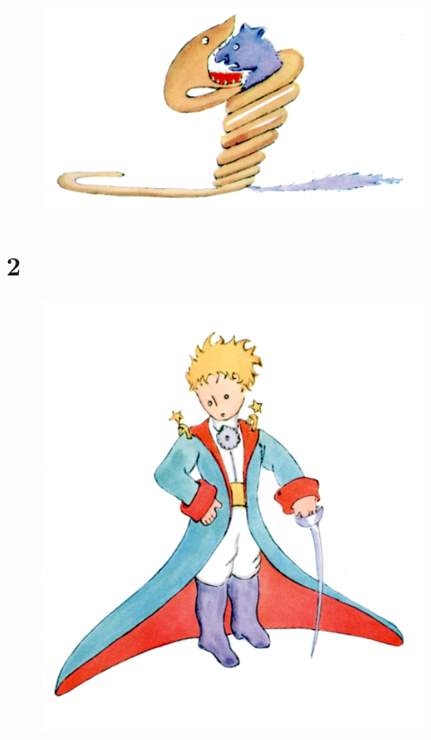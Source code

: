 \documentclass{tufte-handout}
\begin{document}
\begin{figure}
    \centering
    \includegraphics{fig46817_02.png}
\end{figure}


\newpage
\section{2}
\begin{figure}
    \centering
    \includegraphics{fig46817_05.png}
\end{figure}
\end{document}
